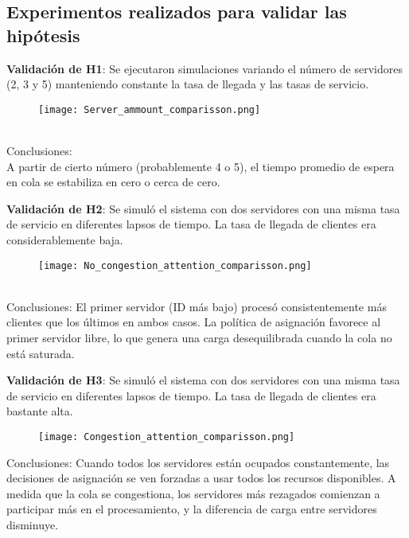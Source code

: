 \documentclass[12pt,a4paper]{article}
\begin{document}
\newpage
\subsection{Experimentos realizados para validar las hipótesis}
\textbf{Validación de H1}: Se ejecutaron simulaciones variando el número de servidores (2, 3 y 5) manteniendo constante la tasa
de llegada y las tasas de servicio.\\
\begin{figure}[!!h]
    \centering
    \texttt{[image: Server\_ammount\_comparisson.png]}
\end{figure}\\\vspace{0.2cm}
Conclusiones: \\
A partir de cierto número (probablemente 4 o 5), el tiempo promedio de espera en cola se estabiliza en cero
o cerca de cero.\\\vspace{1cm}

\textbf{Validación de H2}: Se simuló el sistema con dos servidores con una misma tasa de servicio en diferentes lapsos de tiempo.
La tasa de llegada de clientes era considerablemente baja.\\
\begin{figure}[!!h]
    \centering
    \texttt{[image: No\_congestion\_attention\_comparisson.png]}
\end{figure}\\\vspace{0.2cm}
\newpage
Conclusiones: El primer servidor (ID más bajo) procesó consistentemente más clientes que los últimos en ambos casos. La política
de asignación favorece al primer servidor libre, lo que genera una carga desequilibrada cuando la cola no está saturada.\\\vspace{1cm}

\textbf{Validación de H3}: Se simuló el sistema con dos servidores con una misma tasa de servicio en diferentes lapsos de tiempo.
La tasa de llegada de clientes era bastante alta.\\
\begin{figure}[!!h]
    \centering
    \texttt{[image: Congestion\_attention\_comparisson.png]}
\end{figure}
Conclusiones: Cuando todos los servidores están ocupados constantemente, las decisiones de asignación se ven forzadas a usar 
todos los recursos disponibles. A medida que la cola se congestiona, los servidores más rezagados comienzan a participar más
en el procesamiento, y la diferencia de carga entre servidores disminuye.\\\vspace{1cm}
\end{document}
